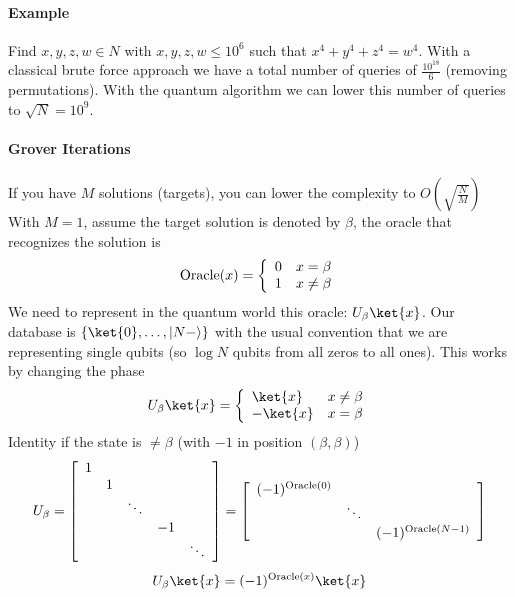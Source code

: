 \documentclass[10pt]{report}
\begin{document}
\paragraph{Example} Find $x,y,z,w\in N$ with $x,y,z,w\leq 10^6$ such that $x^4+y^4+z^4=w^4$. With a classical brute force approach we have a total number of queries of $\frac{10^{18}}{6}$ (removing permutations). With the quantum algorithm we can lower this number of queries to $\sqrt{N} = 10^9$.
\paragraph{Grover Iterations} If you have $M$ solutions (targets), you can lower the complexity to $O\left(\sqrt{\frac{N}{M}}\right)$\\
With $M=1$, assume the target solution is denoted by $\beta$, the oracle that recognizes the solution is $$\hbox{Oracle}(x) = \left\{\begin{array}{c l}
0&x=\beta\\1&x\neq\beta
\end{array}\right.$$
We need to represent in the quantum world this oracle: $U_\beta\ket{x}$. Our database is $\{\ket{0},\ldots,|N-\rangle\}$ with the usual convention that we are representing single qubits (so $\log N$ qubits from all zeros to all ones). This works by changing the phase
$$U_\beta\ket{x}=\left\{\begin{array}{l l}
\ket{x}&x\neq\beta\\-\ket{x}&x=\beta
\end{array}\right.$$
Identity if the state is $\neq\beta$ (with $-1$ in position $(\beta,\beta)$)
$$U_\beta = \left[\begin{array}{c c c c c}
1\\
&1\\
& &\ddots\\
& & &-1\\
& & & &\ddots\\
\end{array}\right] = \left[\begin{array}{cc c}
(-1)^{\text{Oracle}(0)}\\
&\ddots\\
& & (-1)^{\text{Oracle}(N-1)}\\
\end{array}\right]$$
$$U_\beta\ket{x}=(-1)^{\text{Oracle}(x)}\ket{x}$$
\end{document}
